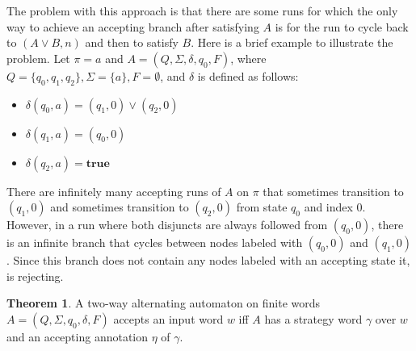 \documentclass[10pt,a4paper]{amsart}
\theoremstyle{plain}
\theoremstyle{definition}
\newtheorem{theorem}[thm]{Theorem}
\theoremstyle{definition}
\DeclareMathOperator{\?}{?}
\begin{document}
The problem with this approach is that there are some runs for which the only way to achieve an accepting
branch after satisfying $A$ is for the run to cycle back to $(A \vee B, n)$ and then to satisfy $B$.
Here is a brief example to illustrate the problem. Let $\pi = a$ and $A = (Q,\Sigma,\delta,q_0,F)$,
where $Q = \{ q_0, q_1, q_2  \}, \Sigma = \{ a \}, F = \emptyset$, and $\delta$ is defined
as follows:
\begin{itemize}
    \item $\delta(q_0,a) = (q_1,0) \vee (q_2,0)$
    \item $\delta(q_1,a) = (q_0,0)$
    \item $\delta(q_2,a) = \textbf{true}$
\end{itemize}

There are infinitely many accepting runs of $A$ on $\pi$ that sometimes transition to
$(q_1,0)$ and sometimes transition to $(q_2,0)$ from state $q_0$
and index 0. However, in a run where both disjuncts are always followed from $(q_0,0)$, there is an infinite
branch that cycles between nodes labeled with $(q_0,0)$ and $(q_1,0)$. Since this branch does not contain any nodes labeled
with an accepting state it, is rejecting.




\begin{theorem}
    A two-way alternating automaton on finite words $A = (Q,\Sigma,q_0,\delta,F)$ accepts an input word $w$ iff $A$ has a strategy word $\gamma$ over $w$ and
    an accepting annotation $\eta$ of $\gamma$.
\end{theorem}
\end{document}

